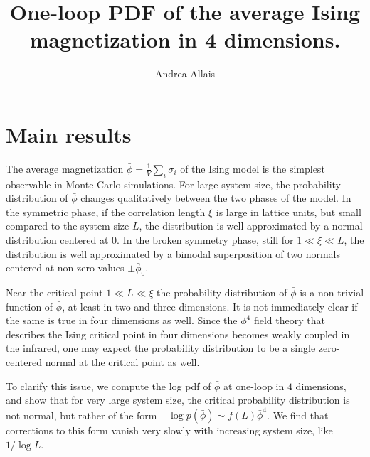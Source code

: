 \documentclass[11pt,a4paper]{article}
\title{One-loop PDF of the average Ising magnetization in 4 dimensions.}
\author{Andrea Allais}
\begin{document}
\maketitle

\section{Main results}

The average magnetization $\bar{\phi} = \frac{1}{V} \sum_{i} \sigma_i$ of the
Ising model is the simplest observable in Monte Carlo simulations. For large
system size, the probability distribution of $\bar{\phi}$ changes qualitatively
between the two phases of the model. In the symmetric phase, if the correlation
length $\xi$ is large in lattice units, but small compared to the system size
$L$, the distribution is well approximated by a normal distribution centered at
0. In the broken symmetry phase, still for $1 \ll \xi \ll L$, the distribution
is well approximated by a bimodal superposition of two normals centered at
non-zero values $\pm \bar{\phi}_0$. 

Near the critical point $1 \ll L \ll \xi$ the probability distribution of
$\bar{\phi}$ is a non-trivial function of $\bar{\phi}$, at least in two and
three dimensions.  It is not immediately clear if the same is true in four
dimensions as well.  Since the $\phi^4$ field theory that describes the Ising
critical point in four dimensions becomes weakly coupled in the infrared, one
may expect the probability distribution to be a single zero-centered normal at
the critical point as well.

To clarify this issue, we compute the log pdf of $\bar{\phi}$ at one-loop in
$4$ dimensions, and show that for very large system size, the critical
probability distribution is not normal, but rather of the form
$-\log p(\bar{\phi})\sim f(L) \bar{\phi}^4$. We find that corrections to this
form vanish very slowly with increasing system size, like $1/\log L$.
\end{document}
